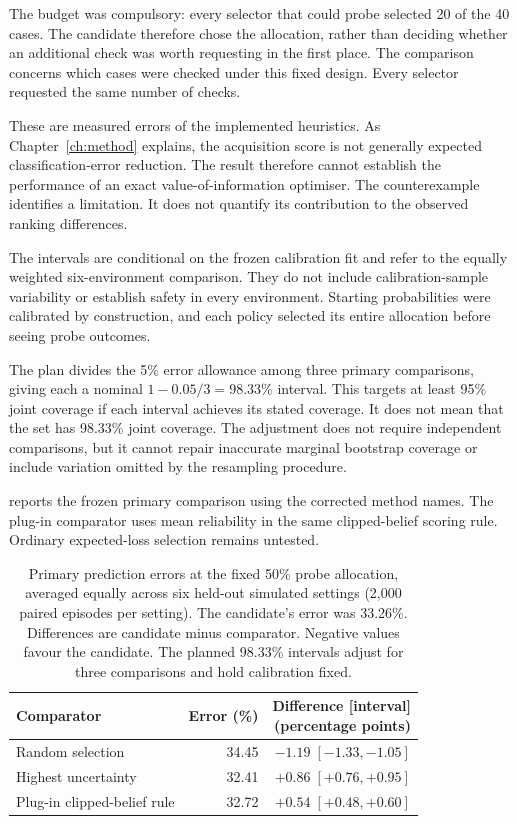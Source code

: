The budget was compulsory: every selector that could probe selected 20 of the 40 cases. The candidate therefore chose the
allocation, rather than deciding whether an additional check was worth requesting in the first place. The comparison
concerns which cases were checked under this fixed design. Every selector requested the same number of checks.

These are measured errors of the implemented heuristics. As Chapter~\ref{ch:method} explains, the acquisition score is not
generally expected classification-error reduction. The result therefore cannot establish the performance of an exact
value-of-information optimiser. The counterexample identifies a limitation. It does not quantify its contribution to the
observed ranking differences.

The intervals are conditional on the frozen calibration fit and refer to the equally weighted six-environment comparison.
They do not include calibration-sample variability or establish safety in every environment. Starting probabilities were
calibrated by construction, and each policy selected its entire allocation before seeing probe outcomes.

The plan divides the 5\% error allowance among three primary comparisons, giving each a nominal
$1-0.05/3=98.33\%$ interval. This targets at least 95\% joint coverage if each interval achieves its stated coverage. It does
not mean that the set has 98.33\% joint coverage. The adjustment does not require independent comparisons, but it cannot
repair inaccurate marginal bootstrap coverage or include variation omitted by the resampling procedure.

 reports the frozen primary comparison using the corrected method names. The plug-in
comparator uses mean reliability in the same clipped-belief scoring rule. Ordinary expected-loss selection remains untested.

\begin{table}[htbp]
  \centering
  \begin{tabularx}{\textwidth}{@{}>{\raggedright\arraybackslash}Xrr@{}}
    \toprule
    Comparator & Error (\%) & \shortstack{Difference [interval]\\(percentage points)} \\
    \midrule
    Random selection & 34.45 & $-1.19\;[-1.33,-1.05]$ \\
    Highest uncertainty & 32.41 & $+0.86\;[+0.76,+0.95]$ \\
    Plug-in clipped-belief rule & 32.72 & $+0.54\;[+0.48,+0.60]$ \\
    \bottomrule
  \end{tabularx}
  \caption{Primary prediction errors at the fixed 50\% probe allocation, averaged equally across six held-out simulated
  settings (2,000 paired episodes per setting). The candidate's error was 33.26\%. Differences are candidate minus comparator.
  Negative values favour the candidate. The planned 98.33\% intervals adjust for three comparisons and hold calibration fixed.}
  \label{tab:m7b-primary-comparison}
\end{table}

